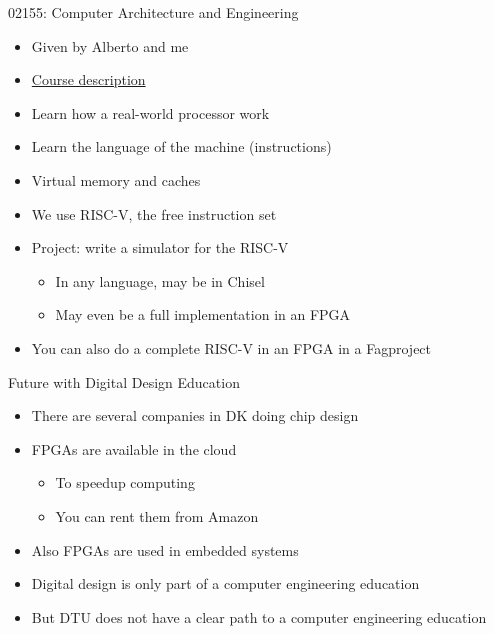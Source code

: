 \begin{frame}[fragile]{02155: Computer Architecture and Engineering}
\begin{itemize}
\item Given by Alberto and me
\item \href{http://www2.imm.dtu.dk/courses/02155/}{Course description}
\item Learn how a real-world processor work
\item Learn the language of the machine (instructions)
\item Virtual memory and caches
\item We use RISC-V, the free instruction set
\item Project: write a simulator for the RISC-V
\begin{itemize}
\item In any language, may be in Chisel
\item May even be a full implementation in an FPGA
\end{itemize}
\item You can also do a complete RISC-V in an FPGA in a Fagproject
\end{itemize}
\end{frame}

\begin{frame}[fragile]{Future with Digital Design Education}
\begin{itemize}
\item There are several companies in DK doing chip design
\item FPGAs are available in the cloud
\begin{itemize}
\item To speedup computing
\item You can rent them from Amazon
\end{itemize}
\item Also FPGAs are used in embedded systems
\item Digital design is only part of a computer engineering education
\item But DTU does not have a clear path to a computer engineering education
\end{itemize}
\end{frame}



